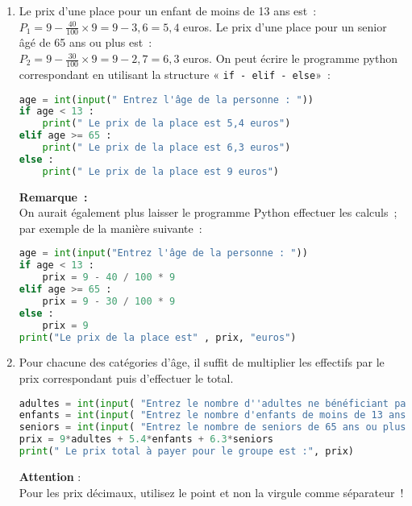 \begin{corrige}
     \begin{enumerate}
          \item
          Le prix d'une place pour un enfant de moins de 13 ans est~:\\
          $ P_{ 1}=9 - \frac{ 40}{ 100 }  \times 9=9 - 3,6=5,4 $ euros.
          \newpar
          Le prix d'une place pour un senior âgé de 65 ans ou plus est~:\\
          $ P_{ 2}=9 - \frac{ 30}{ 100 }  \times 9=9 - 2,7=6,3 $ euros.
          \newpar
          On peut écrire le programme python correspondant en utilisant la structure « \texttt{if - elif - else}»~:
\begin{lstlisting}[language=Python]
age = int(input(" Entrez l'âge de la personne : "))
if age < 13 :
    print(" Le prix de la place est 5,4 euros")
elif age >= 65 :
    print(" Le prix de la place est 6,3 euros")
else : 
    print(" Le prix de la place est 9 euros")
          \end{lstlisting}
          \newpar
          \textbf{Remarque~:}\\
          On aurait également plus laisser le programme Python effectuer les calculs~; par exemple de la manière suivante~:
\begin{lstlisting}[language=Python]
age = int(input("Entrez l'âge de la personne : "))
if age < 13 :
    prix = 9 - 40 / 100 * 9
elif age >= 65 :
    prix = 9 - 30 / 100 * 9
else :
    prix = 9
print("Le prix de la place est" , prix, "euros")
     \end{lstlisting}
     \item
     Pour chacune des catégories d'âge, il suffit de multiplier les effectifs par le prix correspondant puis d'effectuer le total.
\begin{lstlisting}[language=Python]
adultes = int(input( "Entrez le nombre d''adultes ne bénéficiant pas de réduction : "))
enfants = int(input( "Entrez le nombre d'enfants de moins de 13 ans : "))
seniors = int(input( "Entrez le nombre de seniors de 65 ans ou plus : "))
prix = 9*adultes + 5.4*enfants + 6.3*seniors
print(" Le prix total à payer pour le groupe est :", prix)
\end{lstlisting}
\textbf{Attention} :\\
Pour les prix décimaux, utilisez le point et non la virgule comme séparateur~!
\end{enumerate}
\end{corrige}
